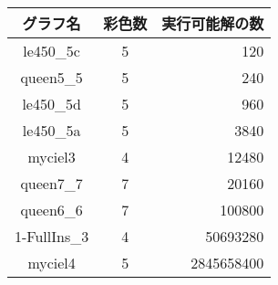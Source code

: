 \begin{tabular}[t]{|c|cr|} \hline
  グラフ名 & 彩色数 & 実行可能解の数 \\ \hline
  le450\_5c & 5 & 120 \\
  queen5\_5 & 5 & 240 \\
  le450\_5d & 5 & 960 \\
  le450\_5a & 5 & 3840 \\
  myciel3 & 4 & 12480 \\
  queen7\_7 & 7 & 20160 \\
  queen6\_6 & 7 & 100800 \\
  1-FullIns\_3 & 4 & 50693280 \\
  myciel4 & 5 & 2845658400 \\ \hline

\end{tabular}